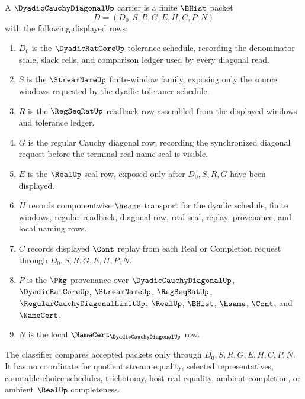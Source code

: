 \begin{definition}
\label{def:dyadic-cauchy-diagonal-carrier}
A $\DyadicCauchyDiagonalUp$ carrier is a finite $\BHist$ packet
$$
D=(D_0,S,R,G,E,H,C,P,N)
$$
with the following displayed rows:
\begin{enumerate}
\item $D_0$ is the $\DyadicRatCoreUp$ tolerance schedule, recording the denominator scale, slack cells, and comparison ledger used by every diagonal read.
\item $S$ is the $\StreamNameUp$ finite-window family, exposing only the source windows requested by the dyadic tolerance schedule.
\item $R$ is the $\RegSeqRatUp$ readback row assembled from the displayed windows and tolerance ledger.
\item $G$ is the regular Cauchy diagonal row, recording the synchronized diagonal request before the terminal real-name seal is visible.
\item $E$ is the $\RealUp$ seal row, exposed only after $D_0,S,R,G$ have been displayed.
\item $H$ records componentwise $\hsame$ transport for the dyadic schedule, finite windows, regular readback, diagonal row, real seal, replay, provenance, and local naming rows.
\item $C$ records displayed $\Cont$ replay from each Real or Completion request through $D_0,S,R,G,E,H,P,N$.
\item $P$ is the $\Pkg$ provenance over $\DyadicCauchyDiagonalUp$, $\DyadicRatCoreUp$, $\StreamNameUp$, $\RegSeqRatUp$, $\RegularCauchyDiagonalLimitUp$, $\RealUp$, $\BHist$, $\hsame$, $\Cont$, and $\NameCert$.
\item $N$ is the local $\NameCert_{\DyadicCauchyDiagonalUp}$ row.
\end{enumerate}
The classifier compares accepted packets only through $D_0,S,R,G,E,H,C,P,N$. It has no coordinate for quotient stream equality, selected representatives, countable-choice schedules, trichotomy, host real equality, ambient completion, or ambient $\RealUp$ completeness.
\end{definition}

